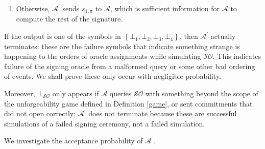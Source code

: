 \documentclass{iacrtrans}
\theoremstyle{definition}
\numberwithin{theorem}{subsection}
\numberwithin{lemma}{theorem}
\newcommand{\adversary}{\mathcal{A}}
\begin{document}
\begin{description}
\begin{description}
\begin{enumerate}
\item Otherwise, $\adversary^\prime$ sends $s_{1, \pi}$ to $\adversary$, which is sufficient information for $\adversary$ to compute the rest of the signature.

\end{enumerate}

\end{description}




\end{description}


If the output is one of the symbols in $\left\{\bot_1, \bot_2, \bot_3, \bot_4\right\}$, then $\adversary^\prime$ actually terminates: these are the failure symbols that indicate something strange is happening to the orders of oracle assignments while simulating $\mathcal{SO}$. This indicates failure of the signing oracle from a malformed query or some other bad ordering of events. We shall prove these only occur with negligible probability.

Moreover, $\bot_{\mathcal{SO}}$ only appears if $\adversary$ queries $\mathcal{SO}$ with something beyond the scope of the unforgeability game defined in Definition \ref{game}, or sent commitments that did not open correctly; $\adversary^\prime$ does not terminate because these are successful simulations of a failed signing ceremony, not a failed simulation. 

We investigate the acceptance probability of $\adversary^\prime$.
\end{document}
